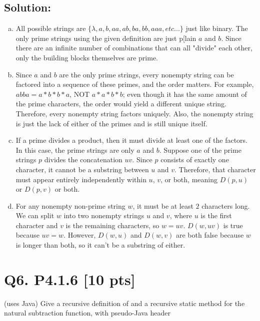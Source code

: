 \documentclass[12pt]{article}
\begin{document}
	\subsection*{\textbf{Solution:}}
	\begin{enumerate}[(a)]
		\item All possible strings are $\{\lambda,a,b,aa,ab,ba,bb,aaa,etc...\}$ just
			like binary. The only prime strings using the given definition are just p[lain
			$a$ and $b$. Since there are an infinite number of combinations that can all
			"divide" each other, only the building blocks themselves are prime.

		\item Since $a$ and $b$ are the only prime strings, every nonempty string
			can be factored into a sequence of these primes, and the order matters.
			For example, $abba=a*b*b*a$, NOT $a*a*b*b$; even though it has the same amount
			of the prime characters, the order would yield a different unique string. Therefore,
			every nonempty string factors uniquely. Also, the nonempty string is just
			the lack of either of the primes and is still unique itself.

		\item If a prime divides a product, then it must divide at least one of the
			factors. In this case, the prime strings are only $a$ and $b$. Suppose one
			of the prime strings $p$ divides the concatenation $uv$. Since $p$
			consists of exactly one character, it cannot be a substring between $u$ and
			$v$. Therefore, that character must appear entirely independently within $u$,
			$v$, or both, meaning $D(p,u)$ or $D(p,v)$ or both.

		\item For any nonempty non-prime string $w$, it must be at least $2$
			characters long. We can split $w$ into two nonempty strings $u$ and $v$,
			where $u$ is the first character and $v$ is the remaining characters, so $w
			=uv$. $D(w,uv)$ is true because $uv=w$. However, $D(w,u)$ and $D(w,v)$ are
			both false because $w$ is longer than both, so it can't be a substring of either.
	\end{enumerate}

	\newpage
	\section*{\textbf{Q6. P4.1.6} [10 pts]}
	(uses Java) Give a recursive definition of and a recursive static method for
	the natural subtraction function, with pseudo-Java header
\end{document}
